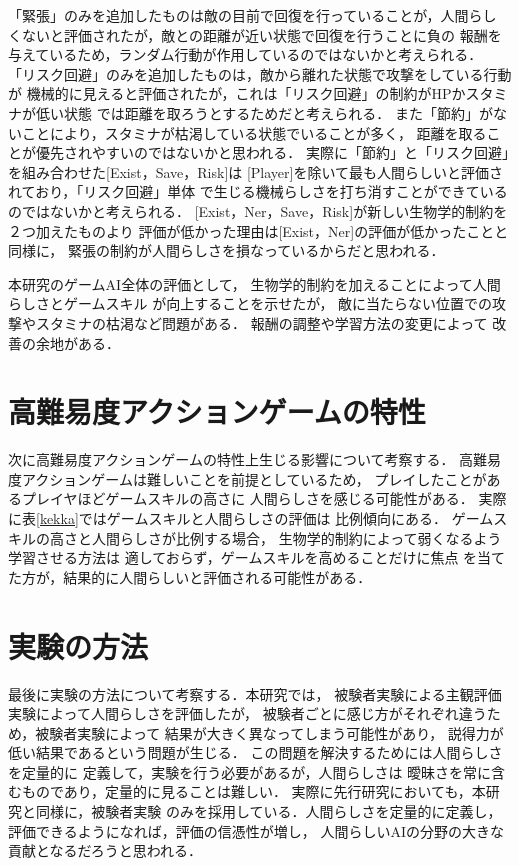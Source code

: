 \documentclass[a4paper,12pt,oneside,openany,titlepage]{jreport}
\begin{document}
「緊張」のみを追加したものは敵の目前で回復を行っていることが，人間らし
くないと評価されたが，敵との距離が近い状態で回復を行うことに負の
報酬を与えているため，ランダム行動が作用しているのではないかと考えられる．
「リスク回避」のみを追加したものは，敵から離れた状態で攻撃をしている行動が
機械的に見えると評価されたが，これは「リスク回避」の制約がHPかスタミナが低い状態
では距離を取ろうとするためだと考えられる．
また「節約」がないことにより，スタミナが枯渇している状態でいることが多く，
距離を取ることが優先されやすいのではないかと思われる．
実際に「節約」と「リスク回避」を組み合わせた[Exist，Save，Risk]は
[Player]を除いて最も人間らしいと評価されており，「リスク回避」単体
で生じる機械らしさを打ち消すことができているのではないかと考えられる．
[Exist，Ner，Save，Risk]が新しい生物学的制約を２つ加えたものより
評価が低かった理由は[Exist，Ner]の評価が低かったことと同様に，
緊張の制約が人間らしさを損なっているからだと思われる．

本研究のゲームAI全体の評価として，
生物学的制約を加えることによって人間らしさとゲームスキル
が向上することを示せたが，
敵に当たらない位置での攻撃やスタミナの枯渇など問題がある．
報酬の調整や学習方法の変更によって
改善の余地がある．


\section{高難易度アクションゲームの特性}
次に高難易度アクションゲームの特性上生じる影響について考察する．
高難易度アクションゲームは難しいことを前提としているため，
プレイしたことがあるプレイヤほどゲームスキルの高さに
人間らしさを感じる可能性がある．
実際に表\ref{kekka}ではゲームスキルと人間らしさの評価は
比例傾向にある．
ゲームスキルの高さと人間らしさが比例する場合，
生物学的制約によって弱くなるよう学習させる方法は
適しておらず，ゲームスキルを高めることだけに焦点
を当てた方が，結果的に人間らしいと評価される可能性がある．





\section{実験の方法}
最後に実験の方法について考察する．本研究では，
被験者実験による主観評価実験によって人間らしさを評価したが，
被験者ごとに感じ方がそれぞれ違うため，被験者実験によって
結果が大きく異なってしまう可能性があり，
説得力が低い結果であるという問題が生じる．
この問題を解決するためには人間らしさを定量的に
定義して，実験を行う必要があるが，人間らしさは
曖昧さを常に含むものであり，定量的に見ることは難しい．
実際に先行研究においても，本研究と同様に，被験者実験
のみを採用している．人間らしさを定量的に定義し，
評価できるようになれば，評価の信憑性が増し，
人間らしいAIの分野の大きな貢献となるだろうと思われる．
\end{document}
